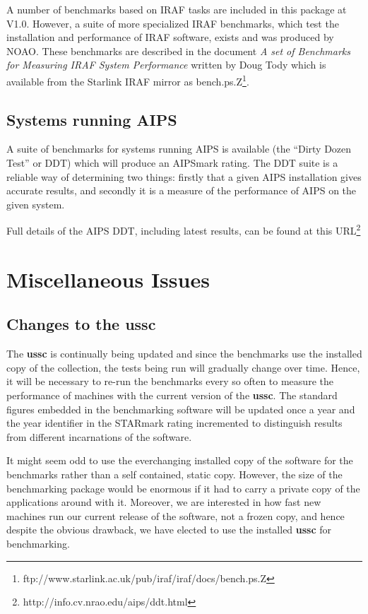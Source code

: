 \documentclass[11pt]{article}
\newcommand{\htmladdnormallinkfoot}[2]{#1\footnote{#2}}
\begin{document}
A number of benchmarks based on IRAF tasks are included in this package
at V1.0. However, a suite of more specialized IRAF benchmarks, which
test the installation and performance of IRAF software, exists and was
produced by NOAO. These benchmarks are described in the document {\em A
set of Benchmarks for Measuring IRAF System Performance} written by
Doug Tody which is available from the Starlink IRAF mirror as
\htmladdnormallinkfoot{bench.ps.Z}{ftp://www.starlink.ac.uk/pub/iraf/iraf/docs/bench.ps.Z}.


\subsection{Systems running AIPS}

A suite of benchmarks for systems running AIPS is available (the ``Dirty Dozen
Test'' or DDT) which will produce an AIPSmark rating.
The DDT suite is a reliable way of determining two things:
firstly that a given AIPS installation gives accurate results, and
secondly it is a measure of the performance of AIPS on the given system.

Full details of the AIPS DDT, including latest results, can be found  \htmladdnormallinkfoot{at this URL}{http://info.cv.nrao.edu/aips/ddt.html}

\section{Miscellaneous Issues}

\subsection{Changes to the ussc}
\label{ussc-changes}

The {\bf ussc} is continually being updated and since the benchmarks use the
installed copy of the collection, the tests being run will gradually
change over time. Hence, it will be necessary to re-run the benchmarks
every so often to measure the performance of machines with the current
version of the {\bf ussc}. The standard figures embedded in the benchmarking
software will be updated once a year and the year identifier in the
STARmark rating incremented to distinguish results from different
incarnations of the software.

It might seem odd to use the everchanging installed copy of the
software for the benchmarks rather than a self contained, static copy.
However, the size of the benchmarking package would be enormous if
it had to carry a private copy of the applications around with it.
Moreover, we are interested in how fast new machines run our current
release of the software, not a frozen copy, and hence despite the
obvious drawback, we have elected to use the installed {\bf ussc} for
benchmarking.
\end{document}
